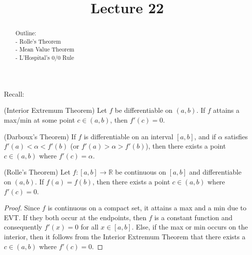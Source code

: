 \documentclass{ximera}
\begin{document}
    \title{Lecture 22}
    
    \begin{abstract}  
    Outline: \\
    - Rolle's Theorem \\
    - Mean Value Theorem \\
    - L'Hospital's 0/0 Rule
\end{abstract}

\maketitle

Recall:

\begin{theorem}{(Interior Extremum Theorem)}
    Let $f$ be differentiable on $(a,b)$.  If $f$ attains a max/min at some point $c \in (a,b)$, then $f'(c) = 0$.
\end{theorem}

\begin{theorem}{(Darboux's Theorem)}
        If $f$ is differentiable on an interval $[a,b]$, and if $\alpha$ satisfies $f'(a) < \alpha < f'(b)$ (or $f'(a) > \alpha >f'(b)$), then there exists a point $c \in (a,b)$ where $f'(c)= \alpha$.
\end{theorem}

\begin{theorem}{(Rolle's Theorem)}
    Let $f:[a,b] \to \mathbb{R}$ be continuous on $[a,b]$ and differentiable on $(a,b)$.  If $f(a) = f(b)$, then there exists a point $c \in (a,b)$ where $f'(c) = 0$.
\end{theorem}
\begin{proof}
    Since $f$ is continuous on a compact set, it attains a max and a min due to EVT.  If they both occur at the endpoints, then $f$ is a constant function and consequently $f'(x) = 0$ for all $x \in [a,b]$.  Else, if the max or min occurs on the interior, then it follows from the Interior Extremum Theorem that there exists a $c \in (a,b)$ where $f'(c) = 0.$
\end{proof}
\end{document}

